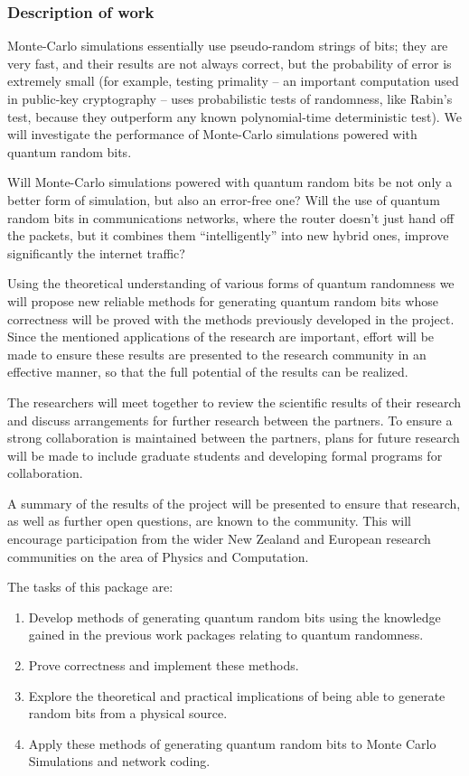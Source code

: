 \documentclass[12pt]{article}
\begin{document}
\subsubsection*{Description of work}


Monte-Carlo simulations  essentially use pseudo-random strings of bits;
they are very fast, and their results are not always correct, but the probability of error is extremely small (for example, testing primality -- an important computation used in public-key cryptography -- uses probabilistic tests of randomness, like Rabin's test, because they outperform  any known polynomial-time deterministic
test). We will investigate the performance of Monte-Carlo simulations powered with
quantum random bits.


Will  Monte-Carlo simulations powered with
quantum random bits be not only  a better form of simulation, but also an error-free one? Will  the use of quantum random bits in communications networks, where  the router doesn't just hand off the packets, but it combines them ``intelligently'' into new hybrid ones, improve significantly the internet traffic?


Using the theoretical understanding of various forms of quantum
randomness we will propose new  reliable methods for generating quantum random bits whose correctness will be proved with the methods previously developed
in the project. Since the mentioned applications of the research are important, effort will be made to ensure these results are presented to the research community in an effective manner, so that the full potential of the results can be realized.

The researchers will meet together to review the scientific results of their research and discuss arrangements for further research between the partners. To ensure a strong collaboration is maintained between the partners, plans for future research will be made to include graduate students and developing formal programs for collaboration.

A summary of the results of the project will be presented to ensure that research, as well as further open questions, are known to the community. This will encourage participation from the wider New Zealand and European research communities on the area of Physics and Computation.

The tasks of this package are:
\begin{enumerate}[label=Task
4.\arabic{enumi}:,leftmargin=3\parindent, labelindent=0pt, labelsep=*]
	\item Develop methods of generating quantum random bits using the knowledge gained in the previous work packages relating to quantum randomness.
	\item Prove correctness and implement these methods.
	\item Explore the theoretical and practical implications of being able to generate random bits from a physical source.
	\item Apply these methods of generating quantum random bits to Monte Carlo Simulations and network coding.
\end{enumerate}
\end{document}
